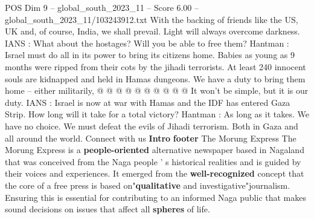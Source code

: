 \begin{textsample}{POS Dim 9 – global\_south\_2023\_11 – Score 6.00 – global\_south\_2023\_11/103243912.txt}
With the backing of friends like the US, UK and, of course, India, we shall prevail.
Light will always overcome darkness.
IANS : What about the hostages?
Will you be able to free them?
Hantman : Israel must do all in its power to bring its citizens home.
Babies as young as 9 months were ripped from their cots by the jihadi terrorists.
At least 240 innocent souls are kidnapped and held in Hamas dungeons.
We have a duty to bring them home -- either militarily, @ @ @ @ @ @ @ @ @ @ It won't be simple, but it is our duty.
IANS : Israel is now at war with Hamas and the IDF has entered Gaza Strip.
How long will it take for a total victory?
Hantman : As long as it takes.
We have no choice.
We must defeat the evils of Jihadi terrorism.
Both in Gaza and all around the world.
Connect with us \textbf{Intro} \textbf{footer} The Morung Express The Morung Express is a \textbf{people-oriented} alternative newspaper based in Nagaland that was conceived from the Naga people ' s historical realities and is guided by their voices and experiences.
It emerged from the \textbf{well-recognized} concept that the core of a free press is based on"\textbf{qualitative} and investigative"journalism.
Ensuring this is essential for contributing to an informed Naga public that makes sound decisions on issues that affect all \textbf{spheres} of life.

\end{textsample}
